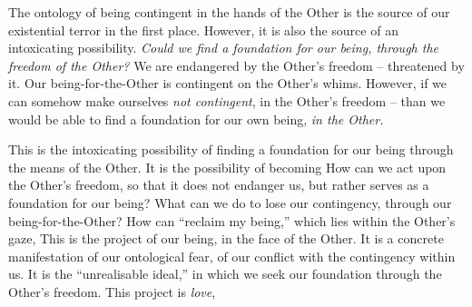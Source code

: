 The ontology of being contingent in the hands of the Other is the source of our existential terror in the first place. However, it is also the source of an intoxicating possibility. \emph{Could we find a foundation for our being, through the freedom of the Other?} We are endangered by the Other's freedom -- threatened by it. Our being-for-the-Other is contingent on the Other's whims. However, if we can somehow make ourselves \emph{not contingent}, in the Other's freedom -- than we would be able to find a foundation for our own being, \emph{in the Other.}

This is the intoxicating possibility of finding a foundation for our being through the means of the Other. It is the possibility of becoming  How can we act upon the Other's freedom, so that it does not endanger us, but rather serves as a foundation for our being? What can we do to lose our contingency, through our being-for-the-Other? How can \enquote{reclaim my being,} which lies within the Other's gaze,  This is the project of our being, in the face of the Other. It is a concrete manifestation of our ontological fear, of our conflict with the contingency within us. It is the \enquote{unrealisable ideal,} in which we seek our foundation through the Other's freedom. This project is \emph{love}, 